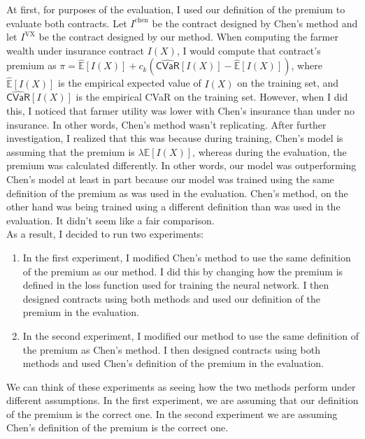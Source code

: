 \documentclass[11pt]{article}
\begin{document}
      At first, for purposes of the evaluation, I used our definition of the premium to evaluate both contracts. Let $I^{\text{chen}}$ be the contract designed by Chen's method and let $I^{\text{VX}}$ be the contract designed by our method. When computing the farmer wealth under insurance contract $I(X)$, I would compute that contract's premium as $\pi = \hat{\mathbb{E}}[I(X)] + c_k \left ( \hat{\textsf{CVaR}}[I(X)] - \hat{\mathbb{E}}[I(X)] \right )$, where $\hat{\mathbb{E}}[I(X)]$ is the empirical expected value of $I(X)$ on the training set, and $\hat{\textsf{CVaR}}[I(X)]$ is the empirical \textsf{CVaR} on the training set. However, when I did this, I noticed that farmer utility was lower with Chen's insurance than under no insurance. In other words, Chen's method wasn't replicating. After further investigation, I realized that this was because during training, Chen's model is assuming that the premium is $\lambda \mathbb{E}[I(X)]$, whereas during the evaluation, the premium was calculated differently. In other words, our model was outperforming Chen's model at least in part because our model was trained using the same definition of the premium as was used in the evaluation. Chen's method, on the other hand was being trained using a different definition than was used in the evaluation. It didn't seem like a fair comparison. \\
      As a result, I decided to run two experiments:
      \begin{enumerate}
        \item In the first experiment, I modified Chen's method to use the same definition of the premium as our method. I did this by changing how the premium is defined in the loss function used for training the neural network. I then designed contracts using both methods and used our definition of the premium in the evaluation. 
        \item In the second experiment, I modified our method to use the same definition of the premium as Chen's method. I then designed contracts using both methods and used Chen's definition of the premium in the evaluation. 
      \end{enumerate}

      We can think of these experiments as seeing how the two methods perform under different assumptions. In the first experiment, we are assuming that our definition of the premium is the correct one. In the second experiment we are assuming Chen's definition of the premium is the correct one. 
\end{document}
